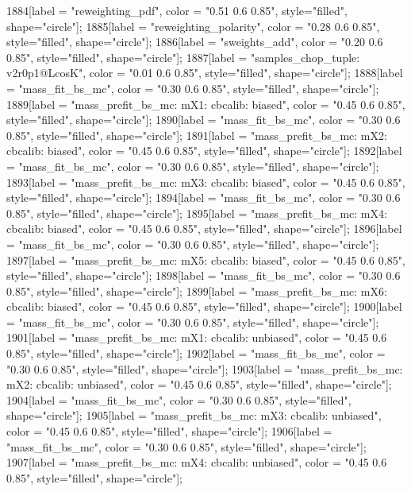 {	1884[label = "reweighting_pdf", color = "0.51 0.6 0.85", style="filled", shape="circle"];
	1885[label = "reweighting_polarity", color = "0.28 0.6 0.85", style="filled", shape="circle"];
	1886[label = "sweights_add", color = "0.20 0.6 0.85", style="filled", shape="circle"];
	1887[label = "samples_chop_tuple\nversion: v2r0p1@LcosK", color = "0.01 0.6 0.85", style="filled", shape="circle"];
	1888[label = "mass_fit_bs_mc", color = "0.30 0.6 0.85", style="filled", shape="circle"];
	1889[label = "mass_prefit_bs_mc\nmassbin: mX1\nmassmodel: cbcalib\ntrigger: biased", color = "0.45 0.6 0.85", style="filled", shape="circle"];
	1890[label = "mass_fit_bs_mc", color = "0.30 0.6 0.85", style="filled", shape="circle"];
	1891[label = "mass_prefit_bs_mc\nmassbin: mX2\nmassmodel: cbcalib\ntrigger: biased", color = "0.45 0.6 0.85", style="filled", shape="circle"];
	1892[label = "mass_fit_bs_mc", color = "0.30 0.6 0.85", style="filled", shape="circle"];
	1893[label = "mass_prefit_bs_mc\nmassbin: mX3\nmassmodel: cbcalib\ntrigger: biased", color = "0.45 0.6 0.85", style="filled", shape="circle"];
	1894[label = "mass_fit_bs_mc", color = "0.30 0.6 0.85", style="filled", shape="circle"];
	1895[label = "mass_prefit_bs_mc\nmassbin: mX4\nmassmodel: cbcalib\ntrigger: biased", color = "0.45 0.6 0.85", style="filled", shape="circle"];
	1896[label = "mass_fit_bs_mc", color = "0.30 0.6 0.85", style="filled", shape="circle"];
	1897[label = "mass_prefit_bs_mc\nmassbin: mX5\nmassmodel: cbcalib\ntrigger: biased", color = "0.45 0.6 0.85", style="filled", shape="circle"];
	1898[label = "mass_fit_bs_mc", color = "0.30 0.6 0.85", style="filled", shape="circle"];
	1899[label = "mass_prefit_bs_mc\nmassbin: mX6\nmassmodel: cbcalib\ntrigger: biased", color = "0.45 0.6 0.85", style="filled", shape="circle"];
	1900[label = "mass_fit_bs_mc", color = "0.30 0.6 0.85", style="filled", shape="circle"];
	1901[label = "mass_prefit_bs_mc\nmassbin: mX1\nmassmodel: cbcalib\ntrigger: unbiased", color = "0.45 0.6 0.85", style="filled", shape="circle"];
	1902[label = "mass_fit_bs_mc", color = "0.30 0.6 0.85", style="filled", shape="circle"];
	1903[label = "mass_prefit_bs_mc\nmassbin: mX2\nmassmodel: cbcalib\ntrigger: unbiased", color = "0.45 0.6 0.85", style="filled", shape="circle"];
	1904[label = "mass_fit_bs_mc", color = "0.30 0.6 0.85", style="filled", shape="circle"];
	1905[label = "mass_prefit_bs_mc\nmassbin: mX3\nmassmodel: cbcalib\ntrigger: unbiased", color = "0.45 0.6 0.85", style="filled", shape="circle"];
	1906[label = "mass_fit_bs_mc", color = "0.30 0.6 0.85", style="filled", shape="circle"];
	1907[label = "mass_prefit_bs_mc\nmassbin: mX4\nmassmodel: cbcalib\ntrigger: unbiased", color = "0.45 0.6 0.85", style="filled", shape="circle"];
}
